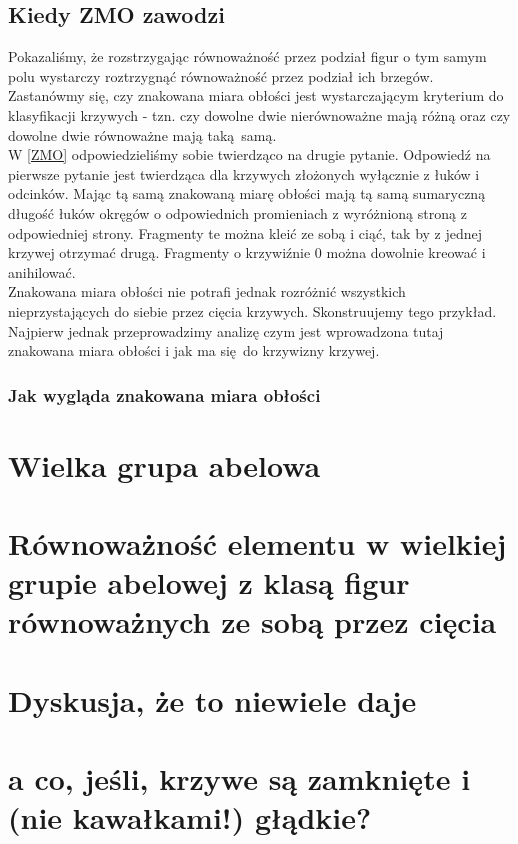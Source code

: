 \documentclass[a4paper, 12pt]{article}
\begin{document}
\subsection{Kiedy ZMO zawodzi}
Pokazaliśmy, że rozstrzygając równoważność przez podział figur o tym samym polu wystarczy roztrzygnąć
równoważność przez podział ich brzegów. Zastanówmy się, czy znakowana miara obłości jest wystarczającym
kryterium do klasyfikacji krzywych - tzn. czy dowolne dwie nierównoważne mają różną oraz czy dowolne
dwie równoważne mają taką samą. \\
W \ref{ZMO} odpowiedzieliśmy sobie twierdząco na drugie pytanie.
Odpowiedź na pierwsze pytanie jest twierdząca dla krzywych złożonych wyłącznie z łuków i odcinków.
Mając tą samą znakowaną miarę obłości mają tą samą sumaryczną długość łuków okręgów o odpowiednich
promieniach z wyróżnioną stroną z odpowiedniej strony. Fragmenty te można kleić ze sobą i ciąć, tak by
z jednej krzywej otrzymać drugą. Fragmenty o krzywiźnie 0 można dowolnie kreować i anihilować. \\
Znakowana miara obłości nie potrafi jednak rozróżnić wszystkich nieprzystających do siebie przez cięcia
krzywych. Skonstruujemy tego przykład. Najpierw jednak przeprowadzimy analizę czym jest
wprowadzona tutaj znakowana miara obłości i jak ma się do krzywizny krzywej.
\subsubsection{Jak wygląda znakowana miara obłości}


\section{Wielka grupa abelowa}

\section{Równoważność elementu w wielkiej grupie abelowej z klasą figur równoważnych ze sobą przez cięcia}

\section{Dyskusja, że to niewiele daje}

\section{a co, jeśli, krzywe są zamknięte i (nie kawałkami!) głądkie?}
\end{document}
